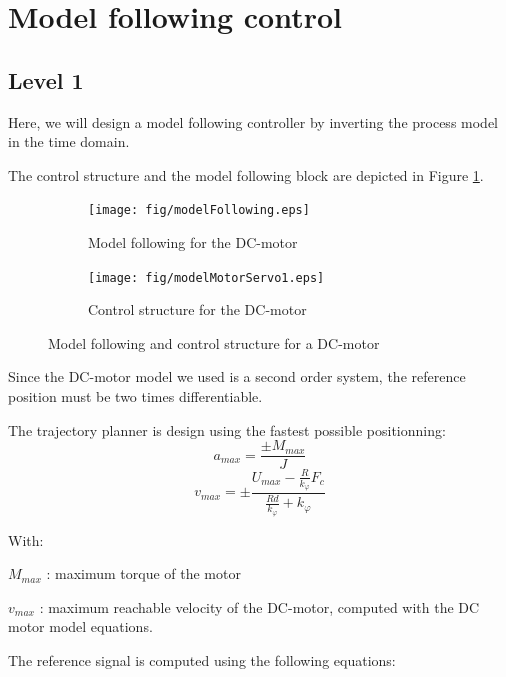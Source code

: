\section*{Model following control}

\subsection*{Level 1}

Here, we will design a model following controller by inverting the process model in the time domain.

The control structure and the model following block are depicted in Figure \ref{contStruct}.

\begin{figure}[t!p]
\begin{center}
  \begin{subfigure}[b]{\columnwidth}
  \texttt{[image: fig/modelFollowing.eps]}
 \caption{Model following for the DC-motor}
  \end{subfigure}
    \begin{subfigure}[b]{\columnwidth}
  \texttt{[image: fig/modelMotorServo1.eps]}
   \caption{Control structure for the DC-motor}
  \end{subfigure}
  \caption{Model following and control structure for a DC-motor}
 \label{contStruct}
\end{center}
\end{figure}

Since the DC-motor model we used is a second order system, the reference position must be two times differentiable. 

The trajectory planner is design using the fastest possible positionning:
\begin{equation}a_{max} = \frac{\pm M_{max}}{J}\end{equation}
\begin{equation}v_{max} = \pm \frac{U_{max} - \frac{R}{k_\varphi} F_c}{\frac{R d}{k_\varphi} + k_\varphi}\end{equation}

With:

$M_{max}$ : maximum torque of the motor

$v_{max}$ : maximum reachable velocity of the DC-motor, computed with the DC motor model equations.

The reference signal is computed using the following equations:

